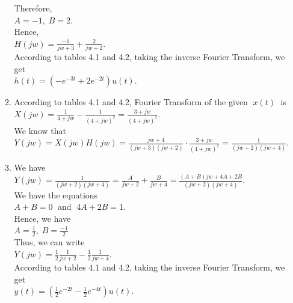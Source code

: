 \documentclass[10pt,a4paper, margin=1in]{article}
\begin{document}
\begin{enumerate}
\begin{enumerate}
    Therefore,\vspace{0.3cm}\\
    $A=-1,\; B=2.$\vspace{0.3cm}\\
    Hence,\vspace{0.3cm}\\
    $H(jw) = \frac{-1}{jw+3}+\frac{2}{jw+2}$.\vspace{0.3cm}\\
    According to tables 4.1 and 4.2, taking the inverse Fourier Transform, we get\vspace{0.3cm}\\
    $h(t) = (-e^{-3t}+2e^{-2t})u(t).$\vspace{0.3cm}\\
	\item %
	According to tables 4.1 and 4.2, Fourier Transform of the given $\;x(t)\;$ is\vspace{0.3cm}\\
    $X(jw) = \frac{1}{4+jw} - \frac{1}{(4+jw)^2} = \frac{3+jw}{(4+jw)^2}.$\vspace{0.3cm}\\
    We know that\vspace{0.3cm}\\
    $Y(jw) = X(jw)H(jw) = \frac{jw+4}{(jw+3)(jw+2)}\cdot \frac{3+jw}{(4+jw)^2} = \frac{1}{(jw+2)(jw+4)}.$\vspace{0.3cm}\\
	\item %
	We have\vspace{0.3cm}\\
    $Y(jw) = \frac{1}{(jw+2)(jw+4)} = \frac{A}{jw+2} + \frac{B}{jw+4} = \frac{(A+B)jw+4A+2B}{(jw+2)(jw+4)}.$\vspace{0.3cm}\\
    We have the equations\vspace{0.3cm}\\
    $A+B=0\;$ and $\; 4A+2B=1$.\vspace{0.3cm}\\
    Hence, we have\vspace{0.3cm}\\
    $A=\frac{1}{2},\; B=\frac{-1}{2}$\vspace{0.3cm}\\
    Thus, we can write\vspace{0.3cm}\\
    $Y(jw) = \frac{1}{2}\frac{1}{jw+2}-\frac{1}{2}\frac{1}{jw+4}.$\vspace{0.3cm}\\
    According to tables 4.1 and 4.2, taking the inverse Fourier Transform, we get\vspace{0.3cm}\\
    $y(t) = (\frac{1}{2}e^{-2t}-\frac{1}{2}e^{-4t})u(t).$\vspace{0.3cm}\\
    \end{enumerate}


\end{enumerate}
\end{document}
